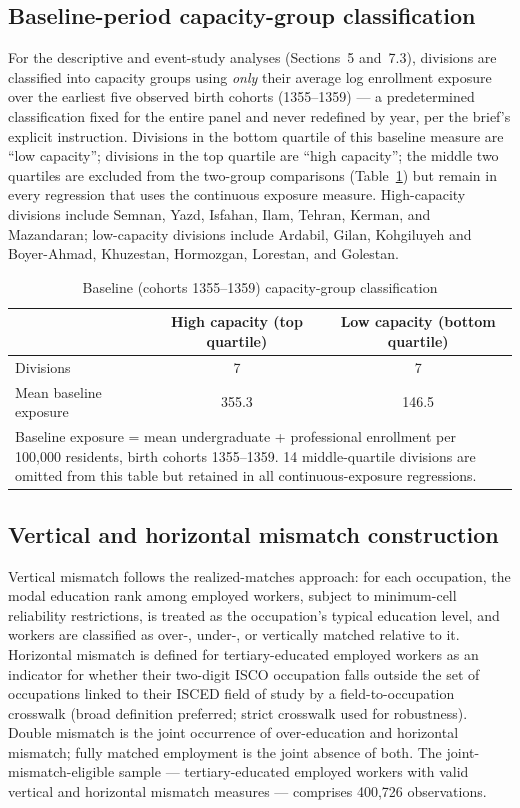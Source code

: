\documentclass[11pt]{article}
\begin{document}
\subsection{Baseline-period capacity-group classification}
\label{sec:capacity-groups}

For the descriptive and event-study analyses (Sections~5 and~7.3), divisions are classified into capacity groups using \emph{only} their average log enrollment exposure over the earliest five observed birth cohorts (1355--1359) --- a predetermined classification fixed for the entire panel and never redefined by year, per the brief's explicit instruction. Divisions in the bottom quartile of this baseline measure are ``low capacity''; divisions in the top quartile are ``high capacity''; the middle two quartiles are excluded from the two-group comparisons (Table~\ref{tab:capacitygroups}) but remain in every regression that uses the continuous exposure measure. High-capacity divisions include Semnan, Yazd, Isfahan, Ilam, Tehran, Kerman, and Mazandaran; low-capacity divisions include Ardabil, Gilan, Kohgiluyeh and Boyer-Ahmad, Khuzestan, Hormozgan, Lorestan, and Golestan.

\begin{table}[htbp]
\centering
\caption{Baseline (cohorts 1355--1359) capacity-group classification}
\label{tab:capacitygroups}
\begin{tabular}{lcc}
\toprule
 & High capacity (top quartile) & Low capacity (bottom quartile) \\
\midrule
Divisions & 7 & 7 \\
Mean baseline exposure & 355.3 & 146.5 \\
\bottomrule
\multicolumn{3}{p{0.7\textwidth}}{\footnotesize Baseline exposure = mean undergraduate + professional enrollment per 100,000 residents, birth cohorts 1355--1359. 14 middle-quartile divisions are omitted from this table but retained in all continuous-exposure regressions.}
\end{tabular}
\end{table}

\subsection{Vertical and horizontal mismatch construction}

Vertical mismatch follows the realized-matches approach: for each occupation, the modal education rank among employed workers, subject to minimum-cell reliability restrictions, is treated as the occupation's typical education level, and workers are classified as over-, under-, or vertically matched relative to it. Horizontal mismatch is defined for tertiary-educated employed workers as an indicator for whether their two-digit ISCO occupation falls outside the set of occupations linked to their ISCED field of study by a field-to-occupation crosswalk (broad definition preferred; strict crosswalk used for robustness). Double mismatch is the joint occurrence of over-education and horizontal mismatch; fully matched employment is the joint absence of both. The joint-mismatch-eligible sample --- tertiary-educated employed workers with valid vertical and horizontal mismatch measures --- comprises 400{,}726 observations.
\end{document}
